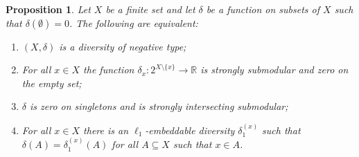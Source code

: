 \documentclass{article}
\theoremstyle{plain}
\newtheorem{proposition}[theorem]{Proposition}
\theoremstyle{definition}
\renewcommand{\Re}{\mathbb{R}}
\begin{document}
\begin{proposition} \label{prop:neg_is_strongsubmod}
Let $X$ be a finite set and let $\delta$ be a function on subsets of $X$ such that $\delta(\emptyset) = 0$. The following are equivalent:
\begin{enumerate}[label=(\roman*)]
\item $(X,\delta)$ is a diversity of negative type;
\item For all $x \in X$ the function $\delta_x:2^{X \setminus\{x\}} \rightarrow \Re$ is strongly submodular and zero on the empty set;
\item $\delta$ is zero on singletons and is strongly intersecting submodular;
\item For all $x \in X$ there is an $\ell_1$-embeddable diversity $\delta_1^{(x)}$ such that $\delta(A) = \delta_1^{(x)}(A)$ for all $A \subseteq X$ such that $x \in A$.
\end{enumerate}
\end{proposition}
\end{document}
